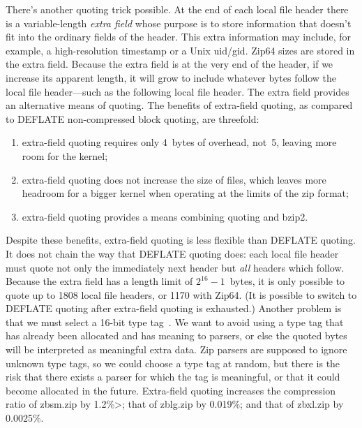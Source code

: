 \documentclass[letterpaper,twocolumn,10pt]{article}
\begin{document}
There's another quoting trick possible.
At the end of each local file header
there is a variable-length
\emph{extra field} whose purpose is to store information
that doesn't fit into the ordinary fields of the header.
This extra information may include, for example,
a high-resolution timestamp or a Unix uid/gid.
Zip64 sizes are stored in the extra field.
Because the extra field is at the very end of the header,
if we increase its apparent length,
it will grow to include whatever bytes follow the local file header—such
as the following local file header.
The extra field provides an alternative means of quoting.
The benefits of extra-field quoting,
as compared to DEFLATE non-compressed block quoting,
are threefold:
\begin{enumerate}
\item extra-field quoting requires only \SI{4}{bytes} of overhead,
not~\num{5}, leaving more room for the kernel;
\item extra-field quoting does not increase the size of files,
which leaves more headroom for a bigger kernel when
operating at the limits of the zip format;
\item extra-field quoting provides a means combining quoting
and bzip2.
\end{enumerate}
Despite these benefits, extra-field quoting is less flexible
than DEFLATE quoting.
It does not chain the way that DEFLATE quoting does:
each local file header must quote not only the immediately next header
but \emph{all} headers which follow.
Because the extra field has a length limit of
$2^{16}-1$~bytes,
it is only possible to quote up to \num{1808}
local file headers,
or \num{1170} with Zip64.
(It is possible to switch to DEFLATE quoting after extra-field quoting is exhausted.)
Another problem is that we must select a 16-bit type tag~\cite[\S 4.5.2]{appnote}.
We want to avoid using a type tag that has already been allocated
and has meaning to parsers, or else the quoted bytes will be interpreted
as meaningful extra data.
Zip parsers are supposed to ignore unknown type tags,
so we could choose a type tag at random,
but there is the risk that there exists a parser for which the tag
is meaningful, or that it could become allocated in the future.
Extra-field quoting increases the compression ratio of
zbsm.zip by 1.2\%>;
that of zblg.zip by 0.019\%;
and that of zbxl.zip by 0.0025\%.
\end{document}
